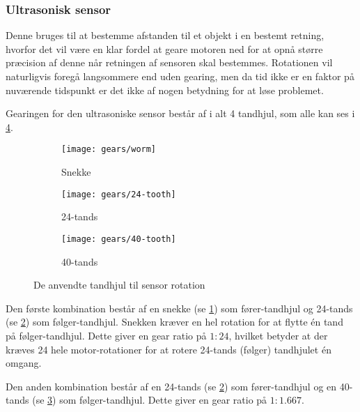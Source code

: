 \subsubsection{Ultrasonisk sensor}
Denne bruges til at bestemme afstanden til et objekt i en bestemt retning, hvorfor det vil være en klar fordel at geare motoren ned for at opnå større præcision af denne når retningen af sensoren skal bestemmes.
Rotationen vil naturligvis foregå langsommere end uden gearing, men da tid ikke er en faktor på nuværende tidspunkt er det ikke af nogen betydning for at løse problemet.

Gearingen for den ultrasoniske sensor består af i alt 4 tandhjul, som alle kan ses i \cref{gearing:tandhjul}.

\begin{figure}[h] %
\centering
\begin{subfigure}[b]{.19\textwidth}
\centering
\texttt{[image: gears/worm]}
\caption{Snekke}
\label{gearing:snekke}
\end{subfigure}
\begin{subfigure}[b]{.19\textwidth}
\centering
\texttt{[image: gears/24-tooth]}
\caption{24-tands}
\label{gearing:24tand}
\end{subfigure}
\begin{subfigure}[b]{.19\textwidth}
\centering
\texttt{[image: gears/40-tooth]}
\caption{40-tands}
\label{gearing:40tand}
\end{subfigure}
\caption{De anvendte tandhjul til sensor rotation}
\label{gearing:tandhjul}
\end{figure}

Den første kombination består af en snekke\cite{snekke} (se \cref{gearing:snekke}) som fører-tandhjul og 24-tands (se \cref{gearing:24tand}) som følger-tandhjul.
Snekken kræver en hel rotation for at flytte én tand på følger-tandhjul.
Dette giver en gear ratio på $1:24$, hvilket betyder at der kræves 24 hele motor-rotationer for at rotere 24-tands (følger) tandhjulet én omgang.

Den anden kombination består af en 24-tands (se \cref{gearing:24tand}) som fører-tandhjul og en 40-tands (se \cref{gearing:40tand}) som følger-tandhjul.
Dette giver en gear ratio på $1:1.667$.

